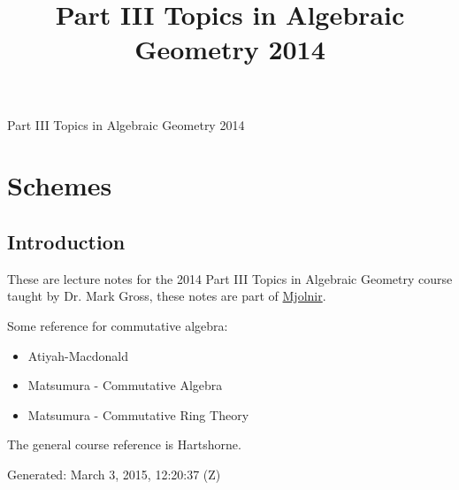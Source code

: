 \documentclass[10pt,]{book}
\title{Part III Topics in Algebraic Geometry 2014}
\author{}
\date{}
\theoremstyle{plain}
\theoremstyle{definition}
\numberwithin{equation}{section}
\begin{document}
\frontmatter
\thispagestyle{empty}
\begin{center}
{\Huge Part III Topics in Algebraic Geometry 2014}
\end{center}\par
{}
\clearpage
\thispagestyle{empty}
\clearpage
\maketitle
\clearpage
\thispagestyle{empty}
\clearpage
\setcounter{tocdepth}{1}
\renewcommand*\contentsname{Contents}
\tableofcontents
\mainmatter
\typeout{************************************************}
\typeout{************************************************}
\chapter[Schemes]{Schemes}\label{chap-schemes}
\typeout{************************************************}
\typeout{************************************************}
\section[Introduction]{Introduction}\label{sec-introduction}
These are lecture notes for the 2014 Part III Topics in Algebraic Geometry course taught by Dr. Mark Gross, these notes are part of \href{https://alexjbest.github.io/mjolnir/}{Mjolnir}.%
\par
Some reference for commutative algebra:
          \begin{itemize}
\item{}Atiyah-Macdonald\item{}Matsumura - Commutative Algebra \item{}Matsumura - Commutative Ring Theory\end{itemize}

          The general course reference is Hartshorne.
\par

          Generated: March 3, 2015, 12:20:37 (Z)
\typeout{************************************************}
\typeout{************************************************}
\end{document}
